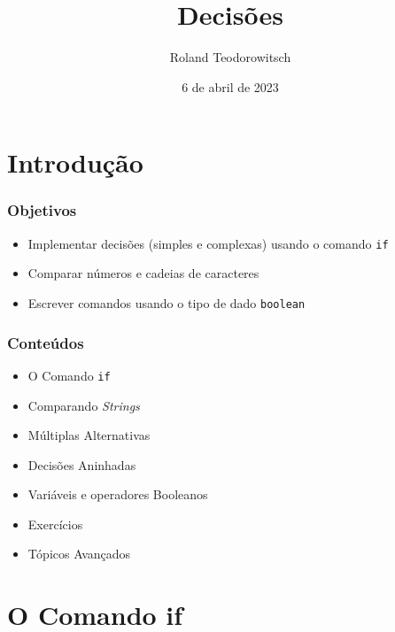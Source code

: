 \documentclass[xcolor={dvipsnames,table},aspectratio=169]{beamer}
\title[\sc{Decisões}]{Decisões}
\author[Roland Teodorowitsch]{Roland Teodorowitsch}
\institute[FPROG - EP - PUCRS]{Fundamentos de Programação - Escola Politécnica - PUCRS}
\date{6 de abril de 2023}
\begin{document}
\justifying

\begin{frame}
	\titlepage
\end{frame}

\section{Introdução}

\begin{frame}\frametitle{Objetivos}
\begin{itemize}
	\item Implementar decisões (simples e complexas) usando o comando \texttt{if}
	\item Comparar números e cadeias de caracteres
	\item Escrever comandos usando o tipo de dado \texttt{boolean}
\end{itemize}
\end{frame}

\begin{frame}\frametitle{Conteúdos}
\begin{itemize}
	\item O Comando \texttt{if}
	\item Comparando \emph{Strings}
	\item Múltiplas Alternativas
	\item Decisões Aninhadas
	\item Variáveis e operadores Booleanos
	\item Exercícios
	\item Tópicos Avançados
\end{itemize}
\end{frame}

\section{O Comando if}
\end{document}
